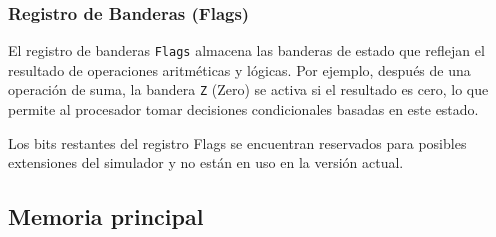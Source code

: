 \documentclass[12pt,oneside]{templates/unerthesis}
\begin{document}
\hypertarget{registro-de-banderas-flags}{%
\subsubsection{Registro de Banderas (Flags)}\label{registro-de-banderas-flags}}

El registro de banderas \texttt{Flags} almacena las banderas de estado que reflejan el resultado de operaciones aritméticas y lógicas. Por ejemplo, después de una operación de suma, la bandera \texttt{Z} (Zero) se activa si el resultado es cero, lo que permite al procesador tomar decisiones condicionales basadas en este estado.

\begin{table}[!h]
\centering
\caption{\label{tab:tflags}Registro Flags: descripción de las banderas}
\centering
{}
\end{table}

Los bits restantes del registro Flags se encuentran reservados para posibles extensiones del simulador y no están en uso en la versión actual.

\hypertarget{memoria-principal}{%
\subsection{Memoria principal}\label{memoria-principal}}
\end{document}
